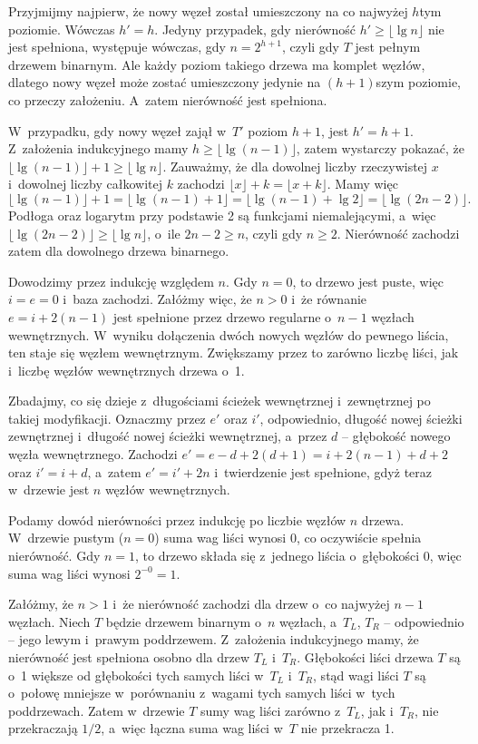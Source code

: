 Przyjmijmy najpierw, że nowy węzeł został umieszczony na co najwyżej $h$\nbhyphen tym poziomie.
Wówczas $h'=h$.
Jedyny przypadek, gdy nierówność $h'\ge\lfloor\lg n\rfloor$ nie jest spełniona, występuje wówczas, gdy $n=2^{h+1}$, czyli gdy $T$ jest pełnym drzewem binarnym.
Ale każdy poziom takiego drzewa ma komplet węzłów, dlatego nowy węzeł może zostać umieszczony jedynie na $(h+1)$\nbhyphen szym poziomie, co przeczy założeniu.
A~zatem nierówność jest spełniona.

W~przypadku, gdy nowy węzeł zajął w~$T'$ poziom $h+1$, jest $h'=h+1$.
Z~założenia indukcyjnego mamy $h\ge\lfloor\lg(n-1)\rfloor$, zatem wystarczy pokazać, że $\lfloor\lg(n-1)\rfloor+1\ge\lfloor\lg n\rfloor$.
Zauważmy, że dla dowolnej liczby rzeczywistej $x$ i~dowolnej liczby całkowitej $k$ zachodzi $\lfloor x\rfloor+k=\lfloor x+k\rfloor$.
Mamy więc
\[
    \lfloor\lg(n-1)\rfloor+1 = \lfloor\lg(n-1)+1\rfloor = \lfloor\lg(n-1)+\lg2\rfloor = \lfloor\lg(2n-2)\rfloor.
\]
Podłoga oraz logarytm przy podstawie 2 są funkcjami niemalejącymi, a~więc $\lfloor\lg(2n-2)\rfloor\ge\lfloor\lg n\rfloor$, o~ile $2n-2\ge n$, czyli gdy $n\ge2$.
Nierówność zachodzi zatem dla dowolnego drzewa binarnego.

\exercise %
Dowodzimy przez indukcję względem $n$.
Gdy $n=0$, to drzewo jest puste, więc $i=e=0$ i~baza zachodzi.
Załóżmy więc, że $n>0$ i~że równanie $e=i+2(n-1)$ jest spełnione przez drzewo regularne o~$n-1$ węzłach wewnętrznych.
W~wyniku dołączenia dwóch nowych węzłów do pewnego liścia, ten staje się węzłem wewnętrznym.
Zwiększamy przez to zarówno liczbę liści, jak i~liczbę węzłów wewnętrznych drzewa o~1.

Zbadajmy, co się dzieje z~długościami ścieżek wewnętrznej i~zewnętrznej po takiej modyfikacji.
Oznaczmy przez $e'$ oraz $i'$, odpowiednio, długość nowej ścieżki zewnętrznej i~długość nowej ścieżki wewnętrznej, a~przez $d$ -- głębokość nowego węzła wewnętrznego.
Zachodzi $e'=e-d+2(d+1)=i+2(n-1)+d+2$ oraz $i'=i+d$, a~zatem $e'=i'+2n$ i~twierdzenie jest spełnione, gdyż teraz w~drzewie jest $n$ węzłów wewnętrznych.

\exercise %
Podamy dowód nierówności przez indukcję po liczbie węzłów $n$ drzewa.
W~drzewie pustym ($n=0$) suma wag liści wynosi 0, co oczywiście spełnia nierówność.
Gdy $n=1$, to drzewo składa się z~jednego liścia o~głębokości 0, więc suma wag liści wynosi $2^{-0}=1$.

Załóżmy, że $n>1$ i~że nierówność zachodzi dla drzew o~co najwyżej $n-1$ węzłach.
Niech $T$ będzie drzewem binarnym o~$n$ węzłach, a~$T_L$, $T_R$ -- odpowiednio -- jego lewym i~prawym poddrzewem.
Z~założenia indukcyjnego mamy, że nierówność jest spełniona osobno dla drzew $T_L$ i~$T_R$.
Głębokości liści drzewa $T$ są o~1 większe od głębokości tych samych liści w~$T_L$ i~$T_R$, stąd wagi liści $T$ są o~połowę mniejsze w~porównaniu z~wagami tych samych liści w~tych poddrzewach.
Zatem w~drzewie $T$ sumy wag liści zarówno z~$T_L$, jak i~$T_R$, nie przekraczają $1/2$, a~więc łączna suma wag liści w~$T$ nie przekracza 1.


